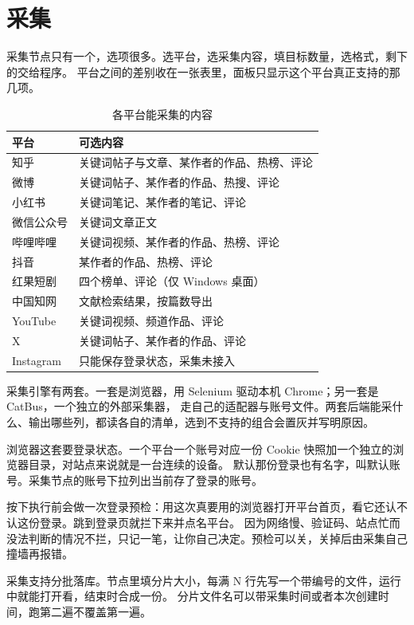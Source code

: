\section{采集}

采集节点只有一个，选项很多。选平台，选采集内容，填目标数量，选格式，剩下的交给程序。
平台之间的差别收在一张表里，面板只显示这个平台真正支持的那几项。

\begin{table}[H]\centering
\caption{各平台能采集的内容}
\label{tab:platforms}
\small
\begin{tabularx}{\textwidth}{p{2.6cm}X}
\toprule
平台 & 可选内容 \\
\midrule
知乎 & 关键词帖子与文章、某作者的作品、热榜、评论 \\
微博 & 关键词帖子、某作者的作品、热搜、评论 \\
小红书 & 关键词笔记、某作者的笔记、评论 \\
微信公众号 & 关键词文章正文 \\
哔哩哔哩 & 关键词视频、某作者的作品、热榜、评论 \\
抖音 & 某作者的作品、热榜、评论 \\
红果短剧 & 四个榜单、评论（仅 Windows 桌面） \\
中国知网 & 文献检索结果，按篇数导出 \\
YouTube & 关键词视频、频道作品、评论 \\
X & 关键词帖子、某作者的作品、评论 \\
Instagram & 只能保存登录状态，采集未接入 \\
\bottomrule
\end{tabularx}
\end{table}

采集引擎有两套。一套是浏览器，用 Selenium 驱动本机 Chrome；另一套是 CatBus，一个独立的外部采集器，
走自己的适配器与账号文件。两套后端能采什么、输出哪些列，都读各自的清单，选到不支持的组合会置灰并写明原因。

浏览器这套要登录状态。一个平台一个账号对应一份 Cookie 快照加一个独立的浏览器目录，对站点来说就是一台连续的设备。
默认那份登录也有名字，叫默认账号。采集节点的账号下拉列出当前存了登录的账号。

按下执行前会做一次登录预检：用这次真要用的浏览器打开平台首页，看它还认不认这份登录。跳到登录页就拦下来并点名平台。
因为网络慢、验证码、站点忙而没法判断的情况不拦，只记一笔，让你自己决定。预检可以关，关掉后由采集自己撞墙再报错。

采集支持分批落库。节点里填分片大小，每满 N 行先写一个带编号的文件，运行中就能打开看，结束时合成一份。
分片文件名可以带采集时间或者本次创建时间，跑第二遍不覆盖第一遍。

